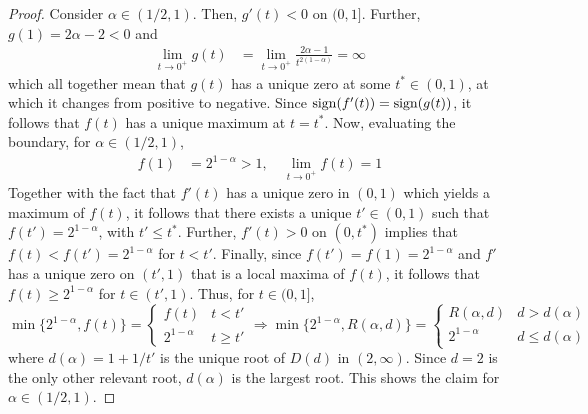 \documentclass[11pt]{article}
\begin{document}
\begin{proof}
    Consider $\alpha \in (1/2,1)$. Then, $g'(t)<0$ on $(0,1]$. Further, $g(1)=2\alpha-2<0$ and
    \begin{align*}
        \lim_{t\to 0^+}g(t)&=\lim_{t\to0^+}\frac{2\alpha-1}{t^{2(1-\alpha)}}=\infty
    \end{align*}
    which all together mean that $g(t)$ has a unique zero at some $t^*\in (0,1)$, at which it changes from positive to negative. Since ${\rm sign}(f'(t))={\rm sign}(g(t))$, it follows that $f(t)$ has a unique maximum at $t=t^*$. Now, evaluating the boundary, for $\alpha \in (1/2,1)$, 
    \begin{align*}
        f(1)&=2^{1-\alpha}>1,\quad \lim_{t\to 0^+}f(t)=1
    \end{align*}
    Together with the fact that $f'(t)$ has a unique zero in $(0,1)$ which yields a maximum of $f(t)$, it follows that there exists a unique $t'\in (0,1)$ such that $f(t')=2^{1-\alpha}$, with $t'\leq t^*$. Further, $f'(t)>0$ on $(0,t^*)$ implies that $f(t)<f(t')=2^{1-\alpha}$ for $t<t'$. Finally, since $f(t')=f(1)=2^{1-\alpha}$ and $f'$ has a unique zero on $(t',1)$ that is a local maxima of $f(t)$, it follows that $f(t)\geq 2^{1-\alpha}$ for $t \in (t',1)$. Thus, for $t\in (0,1]$,
    $$\min\{2^{1-\alpha},f(t)\}=\begin{cases}
        f(t)& t < t'\\
        2^{1-\alpha} & t \geq  t'
    \end{cases}\Rightarrow \min\{2^{1-\alpha},R(\alpha,d)\}=\begin{cases}
        R(\alpha,d) & d > d(\alpha)\\
        2^{1-\alpha} & d \leq d(\alpha)
    \end{cases}$$
    where $d(\alpha)=1+1/t'$ is the unique root of $D(d)$ in $(2,\infty)$. Since $d=2$ is the only other relevant root, $d(\alpha)$ is the largest root. This shows the claim for $\alpha \in (1/2,1)$. 


\end{proof}
\end{document}
